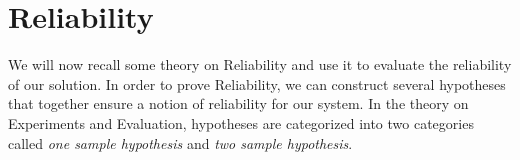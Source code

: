 \section{Reliability}
We will now recall some theory on Reliability and use it to evaluate the reliability of our solution. In order to prove Reliability, we can construct several hypotheses that together ensure a notion of reliability for our system. In the theory on
Experiments and Evaluation, hypotheses are categorized into two categories called \textit{one sample hypothesis} and \textit{two sample hypothesis}.  
